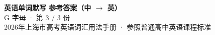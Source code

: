 \documentclass[10pt,a4paper]{article}
\begin{document}
\pagestyle{plain}

\begin{center}
{\LARGE\bfseries 英语单词默写 \quad 参考答案（中 $\to$ 英）}\\[0.22em]
{\large G 字母 · 第 3 / 3 份}\\[0.18em]
{\small 2026年上海市高考英语词汇用法手册 · 参照普通高中英语课程标准}
\end{center}

\vspace{0.2em}
\noindent{\color{rulegray}\rule{\textwidth}{0.8pt}}

\vspace{0.35em}

\vspace{0.25em}
\renewcommand{\arraystretch}{1.32}
\end{document}
